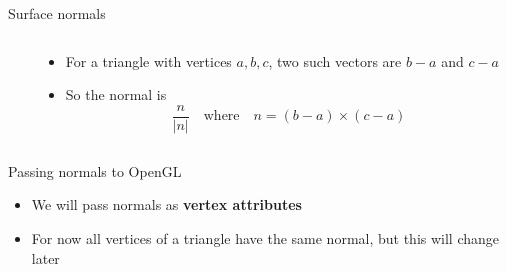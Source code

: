 \begin{frame}{Surface normals}
\begin{columns}
\begin{column}{0.33\textwidth}
		\end{column}
		\begin{column}{0.65\textwidth}
			\begin{itemize}
				\item For a triangle with vertices $a, b, c$, two such vectors are $b-a$ and $c-a$
				\pause\item So the normal is
					$$ \frac{n}{|n|} \quad \text{where} \quad n = (b-a) \times (c-a) $$
			\end{itemize}
		\end{column}
	\end{columns}
\end{frame}

\begin{frame}{Passing normals to OpenGL}
	\begin{itemize}
		\pause\item We will pass normals as \textbf{vertex attributes}
		\pause\item For now all vertices of a triangle have the same normal, but this will change later
	\end{itemize}
\end{frame}
